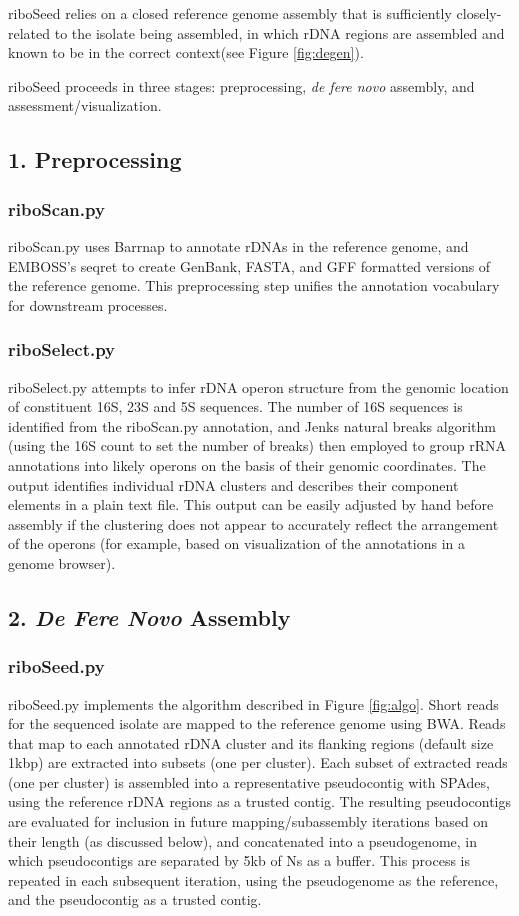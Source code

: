 \documentclass[10pt]{article}
\begin{document}
\begin{linenumbers}
riboSeed relies on a closed reference genome assembly that is sufficiently closely-related to the isolate being assembled, in which rDNA regions are assembled and known to be in the correct context(see Figure \ref{fig:degen}).

riboSeed proceeds in three stages: preprocessing, \textit{de fere novo} assembly, and assessment/visualization.
\subsection*{1. Preprocessing}
\subsubsection*{riboScan.py}
riboScan.py uses Barrnap\cite{Seemann2014} to annotate rDNAs in the reference genome, and EMBOSS's seqret\cite{Rice2000} to create GenBank, FASTA, and GFF formatted versions of the reference genome. This preprocessing step unifies the annotation vocabulary for downstream processes.

\subsubsection*{riboSelect.py}
riboSelect.py attempts to infer rDNA operon structure from the genomic location of constituent 16S, 23S and 5S sequences. The number of 16S sequences is identified from the riboScan.py annotation, and Jenks natural breaks algorithm (using the 16S count to set the number of breaks) then employed to group rRNA annotations into likely operons on the basis of  their genomic coordinates. The output identifies individual rDNA clusters and describes their component elements in a plain text file. This output can be easily adjusted by hand before assembly if the clustering does not appear to accurately reflect the arrangement of the operons (for example, based on visualization of the annotations in a genome browser).

\subsection*{2. \textit{De Fere Novo} Assembly}
\subsubsection*{riboSeed.py}
riboSeed.py implements the algorithm described in Figure \ref{fig:algo}. Short reads for the sequenced isolate are mapped to the reference genome using BWA\cite{Li 2009}. Reads that map to each annotated rDNA cluster and its flanking regions (default size 1kbp) are extracted into subsets (one per cluster). Each subset of extracted reads (one per cluster) is assembled into a representative pseudocontig with SPAdes\cite{Bankevich2012}, using the reference rDNA regions as a trusted contig. The resulting pseudocontigs are evaluated for inclusion in future mapping/subassembly iterations based on their length (as discussed below), and concatenated into a pseudogenome, in which pseudocontigs are separated by 5kb of Ns as a buffer. This process is repeated in each subsequent iteration, using the pseudogenome as the reference, and the pseudocontig as a trusted contig.



\end{linenumbers}
\end{document}
